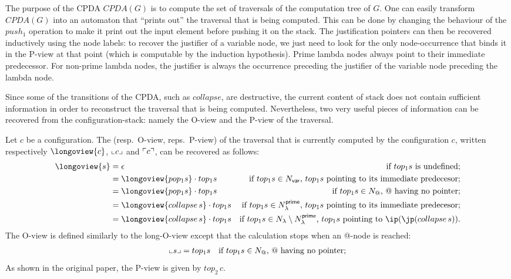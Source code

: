 \documentclass{article}
\theoremstyle{remark}
\theoremstyle{definition}
\begin{document}
The purpose of the CPDA $CPDA(G)$ is to compute the set of traversals of the computation tree of $G$. One can easily transform $CPDA(G)$ into an automaton that ``prints out'' the traversal that is being computed. This can be done by changing the behaviour of the $push_1$ operation to make it print out the input element before pushing it on the stack. The justification pointers can then be recovered
inductively using the node labels: to recover the justifier of a variable node, we just need to look for the only node-occurrence that binds it in the P-view at that point (which is computable by the induction hypothesis).
Prime lambda nodes always point to their immediate predecessor. For non-prime lambda nodes, the justifier is always the occurrence preceding the justifier of the variable node preceding the lambda node.

Since some of the transitions of the CPDA, such as $collapse$, are destructive, the current content of stack does not contain sufficient information in order to reconstruct the traversal that is being computed.
Nevertheless, two very useful pieces of information can be recovered from the configuration-stack: namely the O-view and the P-view of the traversal.

Let $c$ be a configuration. The 
(resp.\ O-view, reps.\ P-view) of the traversal that is currently computed by the configuration $c$, written respectively $\longoview{c}$, $\llcorner c \lrcorner$ and $\ulcorner c \urcorner$, can be recovered as follows:
\begin{align*}
  \longoview{s} &= \epsilon & \mbox{if $top_1 s$ is undefined;} \\
      &=   \longoview{pop_1 s} \cdot top_1 s & \mbox{if $top_1 s \in N_{\sf var}$, $top_1 s$ pointing to its immediate predecesor;} \\
      &=   \longoview{pop_1 s} \cdot top_1 s & \mbox{if $top_1 s \in N_@$, $@$ having no pointer;} \\
      &=   \longoview{collapse\,s} \cdot top_1 s & \mbox{if $top_1 s \in N_\lambda^{\sf prime}$, $top_1 s$ pointing to its immediate predecesor;} \\
      &=   \longoview{collapse\,s} \cdot top_1 s & \mbox{if $top_1 s \in N_\lambda\setminus N_\lambda^{\sf prime}$, $top_1 s$ pointing to $\ip(\jp(collapse\,s))$.} \\
\end{align*}
The O-view is defined similarly to the long-O-view except that the calculation stops when an @-node is reached:
\begin{align*}
  \llcorner s \lrcorner  &=   top_1 s & \mbox{if $top_1 s \in N_@$, $@$ having no pointer;} \\
\end{align*}
As shown in the original paper, the P-view is given by $top_2\,c$.
\end{document}
